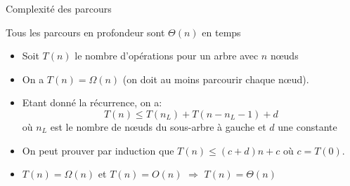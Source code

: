 \begin{frame}{Complexité des parcours}


Tous les parcours en profondeur sont $\Theta(n)$ en temps
\begin{itemize}
\item Soit $T(n)$ le nombre d'opérations pour un arbre avec $n$ n\oe uds
\item On a $T(n)=\Omega(n)$ (on doit au moins parcourir chaque n\oe ud).
\item Etant donné la récurrence, on a:
$$T(n)\leq T(n_L)+T(n-n_L-1) + d$$ où $n_L$ est le nombre de n\oe uds du sous-arbre à gauche et $d$ une constante
\item On peut prouver par induction que $T(n)\leq (c+d) n +c$ où $c=T(0)$.
\item $T(n)=\Omega(n)$ et $T(n)=O(n)$ $\Rightarrow$ $T(n)=\Theta(n)$
\end{itemize}

\end{frame}

